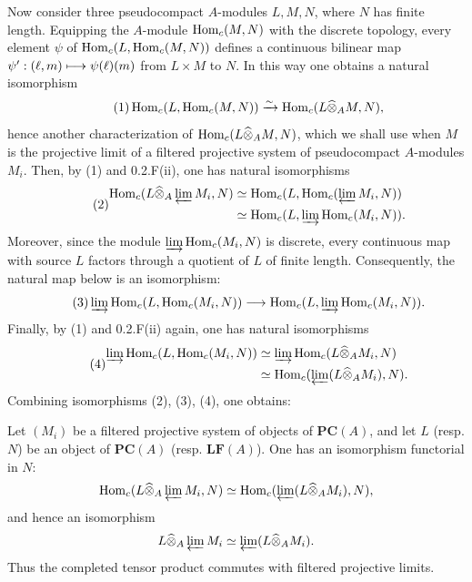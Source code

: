 Now consider three pseudocompact $A$-modules $L,M,N$, where $N$ has finite length. Equipping the $A$-module $\operatorname{Hom}_c(M,N)$ with the discrete topology, every element $\psi$ of $\operatorname{Hom}_c(L,\operatorname{Hom}_c(M,N))$ defines a continuous bilinear map $\psi':(\ell,m)\longmapsto\psi(\ell)(m)$ from $L\times M$ to $N$. In this way one obtains a natural isomorphism
\begin{equation}\tag{1}
\operatorname{Hom}_c(L,\operatorname{Hom}_c(M,N))\xrightarrow{\sim}\operatorname{Hom}_c(L\widehat\otimes_A M,N),
\end{equation}
hence another characterization of $\operatorname{Hom}_c(L\widehat\otimes_A M,N)$, which we shall use when $M$ is the projective limit of a filtered projective system of pseudocompact $A$-modules $M_i$. Then, by (1) and 0.2.F(ii), one has natural isomorphisms
\begin{equation}\tag{2}
\begin{aligned}
\operatorname{Hom}_c(L\widehat\otimes_A\varprojlim M_i,N)&\simeq\operatorname{Hom}_c(L,\operatorname{Hom}_c(\varprojlim M_i,N))\\
&\simeq\operatorname{Hom}_c(L,\varinjlim\operatorname{Hom}_c(M_i,N)).
\end{aligned}
\end{equation}
Moreover, since the module $\varinjlim\operatorname{Hom}_c(M_i,N)$ is discrete, every continuous map with source $L$ factors through a quotient of $L$ of finite length. Consequently, the natural map below is an isomorphism:
\begin{equation}\tag{3}
\varinjlim\operatorname{Hom}_c(L,\operatorname{Hom}_c(M_i,N))\longrightarrow\operatorname{Hom}_c(L,\varinjlim\operatorname{Hom}_c(M_i,N)).
\end{equation}
Finally, by (1) and 0.2.F(ii) again, one has natural isomorphisms
\begin{equation}\tag{4}
\begin{aligned}
\varinjlim\operatorname{Hom}_c(L,\operatorname{Hom}_c(M_i,N))&\simeq\varinjlim\operatorname{Hom}_c(L\widehat\otimes_A M_i,N)\\
&\simeq\operatorname{Hom}_c(\varprojlim(L\widehat\otimes_A M_i),N).
\end{aligned}
\end{equation}
Combining isomorphisms (2), (3), (4), one obtains:
\begin{proposition}{}
Let $(M_i)$ be a filtered projective system of objects of $\mathbf{PC}(A)$, and let $L$ (resp. $N$) be an object of $\mathbf{PC}(A)$ (resp. $\mathbf{LF}(A)$). One has an isomorphism functorial in $N$:
\[
\operatorname{Hom}_c(L\widehat\otimes_A\varprojlim M_i,N)\simeq\operatorname{Hom}_c(\varprojlim(L\widehat\otimes_A M_i),N),
\]
and hence an isomorphism
\[
L\widehat\otimes_A\varprojlim M_i\simeq\varprojlim(L\widehat\otimes_A M_i).
\]
Thus the completed tensor product commutes with filtered projective limits.
\end{proposition}

